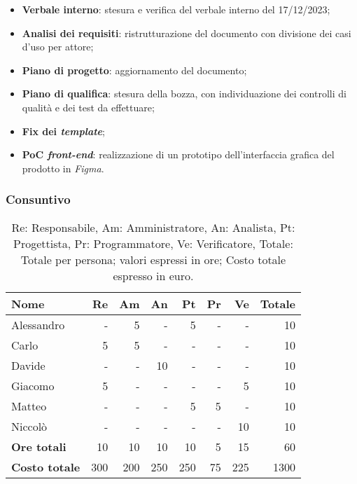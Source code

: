 \begin{itemize}
	\item \textbf{Verbale interno}: stesura e verifica del verbale interno del
	      17/12/2023;

	\item \textbf{Analisi dei requisiti}: ristrutturazione del documento con
	      divisione dei casi d'uso per attore;

	\item \textbf{Piano di progetto}: aggiornamento del documento;

	\item \textbf{Piano di qualifica}: stesura della bozza, con individuazione
	      dei controlli di qualità e dei test da effettuare;

	\item \textbf{Fix dei \textit{template}};

	\item \textbf{PoC \textit{front-end}}: realizzazione di un prototipo
	      dell'interfaccia grafica del prodotto in \textit{Figma}.
\end{itemize}

\subsubsection{Consuntivo}

\begin{table}[H]
	\centering
	\begin{tabular}{l|r|r|r|r|r|r|r}
		\textbf{Nome}         & \textbf{Re} & \textbf{Am} & \textbf{An} & \textbf{Pt} & \textbf{Pr} & \textbf{Ve} & \textbf{Totale} \\
		\hline
		Alessandro            & -           & 5           & -           & 5           & -           & -           & 10              \\
		Carlo                 & 5           & 5           & -           & -           & -           & -           & 10              \\
		Davide                & -           & -           & 10          & -           & -           & -           & 10              \\
		Giacomo               & 5           & -           & -           & -           & -           & 5           & 10              \\
		Matteo                & -           & -           & -           & 5           & 5           & -           & 10              \\
		Niccolò               & -           & -           & -           & -           & -           & 10          & 10              \\
		\hline
		\textbf{Ore totali}   & 10          & 10          & 10          & 10          & 5           & 15          & 60              \\
		\textbf{Costo totale} & 300         & 200         & 250         & 250         & 75          & 225         & 1300
	\end{tabular}
	\caption{Re: Responsabile, Am: Amministratore, An: Analista, Pt: Progettista,
		Pr: Programmatore, Ve: Verificatore, Totale: Totale per persona; valori espressi in ore; Costo totale espresso in euro.}
\end{table}

